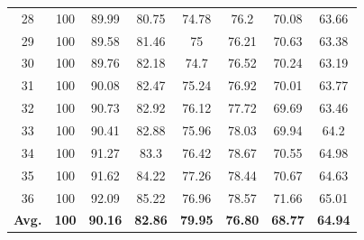 \documentclass[review]{elsarticle}
\begin{document}
\begin{longtable}{c|ccccccc}
		28&100&89.99&80.75&74.78&76.2&70.08&63.66\\
		29&100&89.58&81.46&75&76.21&70.63&63.38\\
		30&100&89.76&82.18&74.7&76.52&70.24&63.19\\
		31&100&90.08&82.47&75.24&76.92&70.01&63.77\\
		32&100&90.73&82.92&76.12&77.72&69.69&63.46\\
		33&100&90.41&82.88&75.96&78.03&69.94&64.2\\
		34&100&91.27&83.3&76.42&78.67&70.55&64.98\\
		35&100&91.62&84.22&77.26&78.44&70.67&64.63\\
		36&100&92.09&85.22&76.96&78.57&71.66&65.01\\
		\hline
		\textbf{Avg.}&\textbf{100}&\textbf{90.16}&\textbf{82.86}&\textbf{79.95}&\textbf{76.80}&\textbf{68.77}&\textbf{64.94}\\
		\hline\hline	
\end{longtable}
\end{document}
